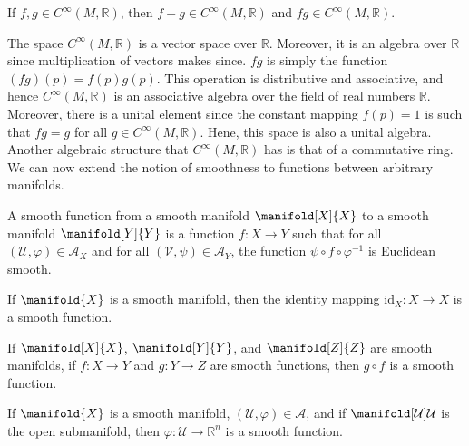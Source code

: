 \documentclass{article}                                                        %
\begin{document}
            \begin{theorem}
                If $f,g\in{C}^{\infty}(M,\mathbb{R})$, then
                $f+g\in{C}^{\infty}(M,\mathbb{R})$ and
                $fg\in{C}^{\infty}(M,\mathbb{R})$.
            \end{theorem}
            The space $C^{\infty}(M,\mathbb{R})$ is a vector space over
            $\mathbb{R}$. Moreover, it is an algebra over $\mathbb{R}$ since
            multiplication of vectors makes since. $fg$ is simply the function
            $(fg)(p)=f(p)g(p)$. This operation is distributive and associative,
            and hence $C^{\infty}(M,\mathbb{R})$ is an associative algebra over
            the field of real numbers $\mathbb{R}$. Moreover, there is a unital
            element since the constant mapping $f(p)=1$ is such that
            $fg=g$ for all $g\in{C}^{\infty}(M,\mathbb{R})$. Hene, this space is
            also a unital algebra. Another algebraic structure that
            $C^{\infty}(M,\mathbb{R})$ has is that of a commutative ring. We can
            now extend the notion of smoothness to functions between arbitrary
            manifolds.
            \begin{definition}
                A smooth function from a smooth manifold $\manifold[X]{X}$ to a
                smooth manifold $\manifold[Y]{Y}$ is a function
                $f:X\rightarrow{Y}$ such that for all
                $(\mathcal{U},\varphi)\in\mathcal{A}_{X}$ and for all
                $(\mathcal{V},\psi)\in\mathcal{A}_{Y}$, the function
                $\psi\circ{f}\circ\varphi^{\minus{1}}$ is Euclidean smooth.
            \end{definition}
            \begin{theorem}
                If $\manifold{X}$ is a smooth manifold, then the identity
                mapping $\textrm{id}_{X}:X\rightarrow{X}$ is a smooth function.
            \end{theorem}
            \begin{theorem}
                If $\manifold[X]{X}$, $\manifold[Y]{Y}$, and $\manifold[Z]{Z}$
                are smooth manifolds, if $f:X\rightarrow{Y}$ and
                $g:Y\rightarrow{Z}$ are smooth functions, then $g\circ{f}$ is a
                smooth function.
            \end{theorem}
            \begin{theorem}
                If $\manifold{X}$ is a smooth manifold,
                $(\mathcal{U},\varphi)\in\mathcal{A}$, and if
                $\manifold[\mathcal{U}]{\mathcal{U}}$ is the open submanifold,
                then $\varphi:\mathcal{U}\rightarrow\mathbb{R}^{n}$ is a smooth
                function.
            \end{theorem}
\end{document}
